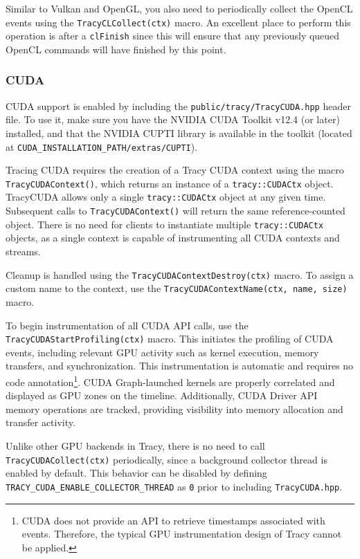 \documentclass[hidelinks,titlepage,a4paper,twoside]{article}
\begin{document}
Similar to Vulkan and OpenGL, you also need to periodically collect the OpenCL events using the \texttt{TracyCLCollect(ctx)} macro. An excellent place to perform this operation is after a \texttt{clFinish} since this will ensure that any previously queued OpenCL commands will have finished by this point.

\subsubsection{CUDA}

CUDA support is enabled by including the \texttt{public/tracy/TracyCUDA.hpp} header file. To use it, make sure you have the NVIDIA CUDA Toolkit v12.4 (or later) installed, and that the NVIDIA CUPTI library is available in the toolkit (located at \texttt{CUDA\_INSTALLATION\_PATH/extras/CUPTI}).

Tracing CUDA requires the creation of a Tracy CUDA context using the macro \texttt{TracyCUDAContext()}, which returns an instance of a \texttt{tracy::CUDACtx} object. TracyCUDA allows only a single \texttt{tracy::CUDACtx} object at any given time. Subsequent calls to \texttt{TracyCUDAContext()} will return the same reference-counted object. There is no need for clients to instantiate multiple \texttt{tracy::CUDACtx} objects, as a single context is capable of instrumenting all CUDA contexts and streams.

Cleanup is handled using the \texttt{TracyCUDAContextDestroy(ctx)} macro. To assign a custom name to the context, use the \texttt{TracyCUDAContextName(ctx, name, size)} macro.

To begin instrumentation of all CUDA API calls, use the \texttt{TracyCUDAStartProfiling(ctx)} macro. This initiates the profiling of CUDA events, including relevant GPU activity such as kernel execution, memory transfers, and synchronization. This instrumentation is automatic and requires no code annotation\footnote{CUDA does not provide an API to retrieve timestamps associated with events. Therefore, the typical GPU instrumentation design of Tracy cannot be applied.}. CUDA Graph-launched kernels are properly correlated and displayed as GPU zones on the timeline. Additionally, CUDA Driver API memory operations are tracked, providing visibility into memory allocation and transfer activity.

Unlike other GPU backends in Tracy, there is no need to call \texttt{TracyCUDACollect(ctx)} periodically, since a background collector thread is enabled by default. This behavior can be disabled by defining \texttt{TRACY\_CUDA\_ENABLE\_COLLECTOR\_THREAD} as \texttt{0} prior to including \texttt{TracyCUDA.hpp}.
\end{document}
